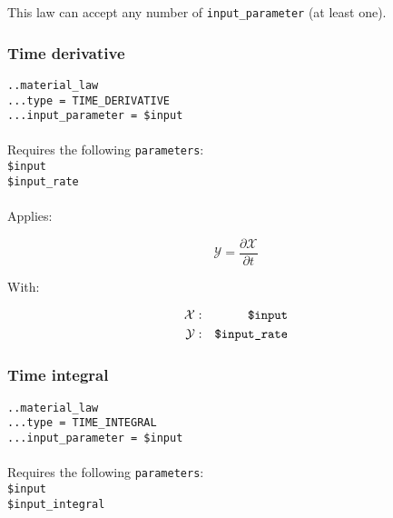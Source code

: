 \documentclass[10pt]{article}
\begin{document}
This law can accept any number of \verb+input_parameter+ (at least one).


\subsubsection{Time derivative}

\noindent \verb+..material_law+\\
\verb+...type = TIME_DERIVATIVE+\\
\verb+...input_parameter = $input+

\paragraph{}Requires the following \verb+parameters+:\\

\noindent \verb+$input+\\
\verb+$input_rate+

\paragraph{}Applies:

\begin{equation}
	\mathcal{Y} = \frac{\partial \mathcal{X}}{\partial t}
\end{equation}

With:

\begin{eqnarray}
	\mathcal{X} & : & \verb+$input+ \notag \\
	\mathcal{Y} & : & \verb+$input_rate+ \notag
\end{eqnarray}

\subsubsection{Time integral}

\noindent \verb+..material_law+\\
\verb+...type = TIME_INTEGRAL+\\
\verb+...input_parameter = $input+

\paragraph{}Requires the following \verb+parameters+:\\

\noindent \verb+$input+\\
\verb+$input_integral+
\end{document}
